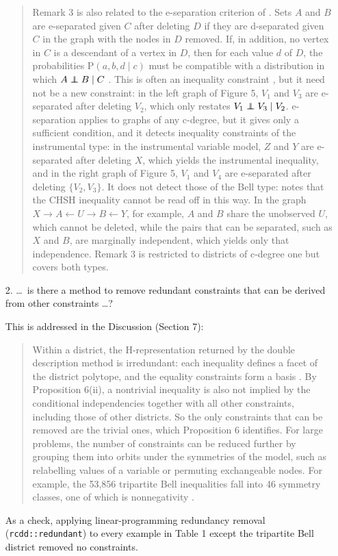 \documentclass{article}
\def\Pr{{\mathrm{P}}}
\newcommand\independent{\protect\mathpalette{\protect\independenT}{\perp}}
\def\independenT#1#2{\mathrel{\rlap{$#1#2$}\mkern2mu{#1#2}}}
\newcommand\indep{\independent}
\begin{document}
\begin{enumerate}
\begin{mdframed}
\begin{quote}
Remark 3 is also related to the e-separation criterion of \citet{evans2012graphical}. Sets $A$ and $B$ are e-separated given $C$ after deleting $D$ if they are d-separated given $C$ in the graph with the nodes in $D$ removed. If, in addition, no vertex in $C$ is a descendant of a vertex in $D$, then for each value $d$ of $D$, the probabilities $\Pr(a, b, d \mid c)$ must be compatible with a distribution in which $A \indep B \mid C$ \citep[Theorem 4.2]{evans2012graphical}. This is often an inequality constraint \citep{evans2012graphical, finkelstein2021entropic}, but it need not be a new constraint: in the left graph of Figure 5, $V_1$ and $V_3$ are e-separated after deleting $V_2$, which only restates $V_1 \indep V_3 \mid V_2$. e-separation applies to graphs of any c-degree, but it gives only a sufficient condition, and it detects inequality constraints of the instrumental type: in the instrumental variable model, $Z$ and $Y$ are e-separated after deleting $X$, which yields the instrumental inequality, and in the right graph of Figure 5, $V_1$ and $V_4$ are e-separated after deleting $\{V_2, V_3\}$. It does not detect those of the Bell type: \citet[Remark 2.6]{evans2023latent} notes that the CHSH inequality cannot be read off in this way. In the graph $X \rightarrow A \leftarrow U \rightarrow B \leftarrow Y$, for example, $A$ and $B$ share the unobserved $U$, which cannot be deleted, while the pairs that can be separated, such as $X$ and $B$, are marginally independent, which yields only that independence. Remark 3 is restricted to districts of c-degree one but covers both types.
\end{quote}
    \end{mdframed}

   \item[2.] \ldots\, is there a method to remove redundant constraints that can be derived from other constraints \ldots?
    \begin{mdframed}
        This is addressed in the Discussion (Section 7):
        \begin{quote}
        Within a district, the H-representation returned by the double description method is irredundant: each inequality defines a facet of the district polytope, and the equality constraints form a basis \citep{fukuda1996double}. By Proposition 6(ii), a nontrivial inequality is also not implied by the conditional independencies together with all other constraints, including those of other districts. So the only constraints that can be removed are the trivial ones, which Proposition 6 identifies. For large problems, the number of constraints can be reduced further by grouping them into orbits under the symmetries of the model, such as relabelling values of a variable or permuting exchangeable nodes. For example, the 53,856 tripartite Bell inequalities fall into 46 symmetry classes, one of which is nonnegativity \citep{Sliwa2003Symmetries}.
        \end{quote}
        As a check, applying linear-programming redundancy removal (\texttt{rcdd::redundant}) to every example in Table 1 except the tripartite Bell district removed no constraints.


\end{mdframed}
\end{enumerate}
\end{document}
